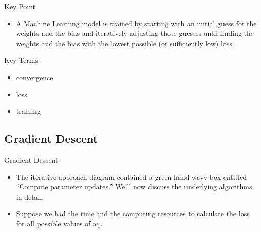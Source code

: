 \documentclass{beamer}
\begin{document}

\begin{frame}{Key Point}
\begin{itemize}
    \item A Machine Learning model is trained by starting with an initial guess for the weights and the bias and iteratively adjusting those guesses until finding the weights and the bias with the lowest possible (or sufficiently low) loss.
\end{itemize}
\end{frame}

\begin{frame}{Key Terms}
\begin{itemize}
    \item convergence
    \item loss
    \item training
\end{itemize}
\end{frame}

\subsection{Gradient Descent}

\begin{frame}{Gradient Descent}
\begin{itemize}
    \item The iterative approach diagram contained a green hand-wavy box entitled ``Compute parameter updates.'' We'll now discuss the underlying algorithms in detail.
    
    \item Suppose we had the time and the computing resources to calculate the loss for all possible values of $w_1$. 
    
\end{itemize}
\end{frame}
\end{document}
